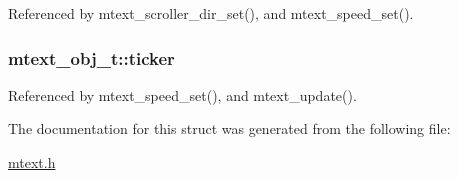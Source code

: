 Referenced by mtext\_\-scroller\_\-dir\_\-set(), and mtext\_\-speed\_\-set().\hypertarget{structmtext__obj__t_7a47047f31618b632c1776a47416f339}{
\subsubsection{ {\bf mtext\_\-obj\_\-t::ticker}}}
\label{structmtext__obj__t_7a47047f31618b632c1776a47416f339}




Referenced by mtext\_\-speed\_\-set(), and mtext\_\-update().

The documentation for this struct was generated from the following file:\begin{CompactItemize}
\item 
\hyperlink{mtext_8h}{mtext.h}\end{CompactItemize}
